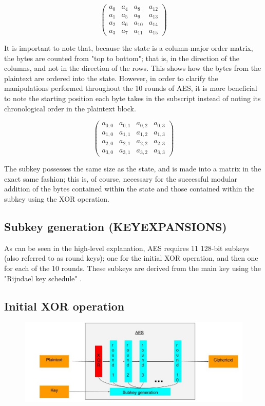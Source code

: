 \documentclass[12pt]{report}
\begin{document}
\[ \left( \begin{array}{cccc}
a_0 & a_4 & a_8 & a_{12} \\
a_1 & a_5 & a_9 & a_{13} \\
a_2 & a_6 & a_{10} & a_{14} \\
a_3 & a_7 & a_{11} & a_{15}\end{array} \right)\] 

It is important to note that, because the state is a column-major order matrix, the bytes are counted from "top to bottom"; that is, in the direction of the columns, and not in the direction of the rows. This shows how the bytes from the plaintext are ordered into the state. However, in order to clarify the manipulations performed throughout the 10 rounds of AES, it is more beneficial to note the starting position each byte takes in the subscript instead of noting its chronological order in the plaintext block.

\[ \left( \begin{array}{cccc}
a_{0,0} & a_{0,1} & a_{0,2} & a_{0,3} \\
a_{1,0} & a_{1,1} & a_{1,2} & a_{1,3} \\
a_{2,0} & a_{2,1} & a_{2,2} & a_{2,3} \\
a_{3,0} & a_{3,1} & a_{3,2} & a_{3,3}\end{array} \right)\] 

The subkey possesses the same size as the state, and is made into a matrix in the exact same fashion; this is, of course, necessary for the successful modular addition of the bytes contained within the state and those contained within the subkey using the XOR operation.

\subsection{Subkey generation (KEYEXPANSIONS)}
As can be seen in the high-level explanation, AES requires 11 128-bit subkeys (also referred to as round keys); one for the initial XOR operation, and then one for each of the 10 rounds. These subkeys are derived from the main key using the "Rijndael key schedule" \cite{KeySchedule}.

\subsection{Initial XOR operation}

\begin{figure}[H]
\centering
\includegraphics[scale=0.4]{AES_fig2.jpg}
\end{figure}
\end{document}
